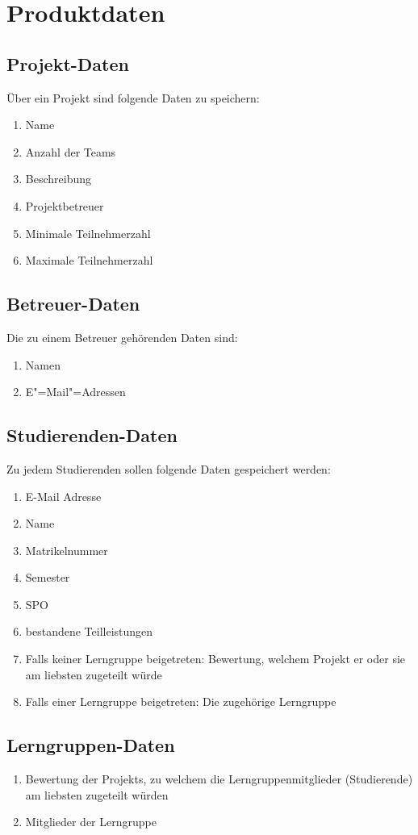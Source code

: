 \documentclass[parskip=full]{scrartcl}
\newcommand{\swtLabel}[1]{\textbf{/#1\arabic*0/}}
\begin{document}
\section{Produktdaten}

\subsection{Projekt-Daten} 
Über ein Projekt sind folgende Daten zu speichern:
\begin{enumerate}[label=\swtLabel{D}] 
  \item Name
  \item Anzahl der Teams
  \item Beschreibung
  \item Projektbetreuer
  \item Minimale Teilnehmerzahl
  \item Maximale Teilnehmerzahl
\end{enumerate}
\subsection{Betreuer-Daten}
Die zu einem Betreuer gehörenden Daten sind:
\begin{enumerate}[label=\swtLabel{D}, resume] 
	\item Namen 
	\item E"=Mail"=Adressen
\end{enumerate}
\subsection{Studierenden-Daten} 
Zu jedem Studierenden sollen folgende Daten gespeichert werden:
\begin{enumerate}[label=\swtLabel{D}, resume] 
  \item E-Mail Adresse \label{SDatenAnfang}
  \item Name
  \item Matrikelnummer
  \item Semester
  \item SPO
  \item bestandene Teilleistungen \label{SDatenEnde}
  \item Falls keiner Lerngruppe beigetreten: Bewertung, welchem Projekt er oder
  sie am liebsten zugeteilt würde
  \item Falls einer Lerngruppe beigetreten: Die zugehörige Lerngruppe
\end{enumerate}
\subsection{Lerngruppen-Daten} 
\begin{enumerate}[label=\swtLabel{D}, resume] 
  \item Bewertung der \glspl{Projekt}, zu welchem die Lerngruppenmitglieder
  (Studierende) am liebsten zugeteilt würden
  \item Mitglieder der Lerngruppe
\end{enumerate}
\end{document}
